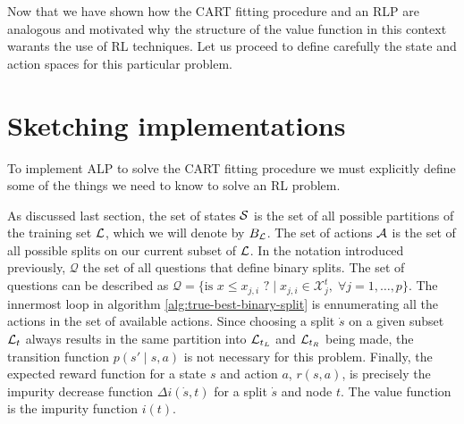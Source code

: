 
Now that we have shown how the CART fitting procedure and an RLP are analogous
and motivated why the structure of the value function in this context warants
the use of RL techniques. Let us proceed to define carefully the state and
action spaces for this particular problem.

\section{Sketching implementations}

To implement ALP to solve the CART fitting procedure we must explicitly define
some of the things we need to know to solve an RL problem.

As discussed last section, the set of states $\mathcal{S}$ is the set of all
possible partitions of the training set $\mathcal{L}$, which we will denote by $B_{\mathcal{L}}$.
The set of actions $\mathcal{A}$ is the set of all possible splits on our current
subset of $\mathcal{L}$. In the notation introduced previously, $\mathcal{Q}$ the set of
all questions that define binary splits. The set of questions can be described
as $\mathcal{Q} = \{ \text{is } x \leq x_{j, i} \text{ ?} \mid x_{j, i} \in
\mathcal{X}_{j}^{t}, \; \forall j = 1, \dots, p \}$.  The innermost loop in
algorithm \ref{alg:true-best-binary-split} is ennumerating all the actions in
the set of available actions. Since choosing a split $\dot{s}$ on a given subset
$\mathcal{L}_t$ always results in the same partition into $\mathcal{L}_{t_L}$ and $\mathcal{L}_{t_R}$ being
made, the transition function $p(s' \mid s, a)$ is not necessary for this
problem. Finally, the expected reward function for a state $s$ and action $a$,
$r(s, a)$, is precisely the impurity decrease function $\Delta i(\dot{s}, t)$
for a split $\dot{s}$ and node $t$. The value function is the impurity function
$i(t)$.

